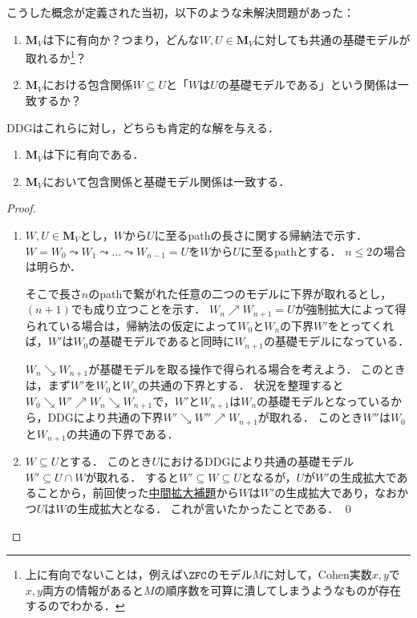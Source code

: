 \documentclass[a4j,leqno]{ltjsarticle}
\newcommand{\DDG}{\mathord{\mathrm{DDG}}}
\begin{document}
こうした概念が定義された当初，以下のような未解決問題があった：
\begin{question}
 \begin{enumerate}
  \item $\mathbf{M}_V$は下に有向か？つまり，どんな$W, U \in \mathbf{M}_V$に対しても共通の基礎モデルが取れるか\footnote{上に有向でないことは，例えば$\ZFC$のモデル$M$に対して，Cohen実数$x,y$で$x,y$両方の情報があると$M$の順序数を可算に潰してしまうようなものが存在するのでわかる．}？
  \item $\mathbf{M}_V$における包含関係$W \subseteq U$と「$W$は$U$の基礎モデルである」という関係は一致するか？
 \end{enumerate}
\end{question}

$\DDG$はこれらに対し，どちらも肯定的な解を与える．

\begin{lemma}
 \begin{enumerate}
  \item $\mathbf{M}_V$は下に有向である．
  \item $\mathbf{M}_V$において包含関係と基礎モデル関係は一致する．
 \end{enumerate}
\end{lemma}
\begin{proof}
 \begin{enumerate}
  \item $W, U \in \mathbf{M}_V$とし，$W$から$U$に至るpathの長さに関する帰納法で示す．
        $W = W_0 \leadsto W_1 \leadsto \dots \leadsto W_{n-1} = U$を$W$から$U$に至るpathとする．
        $n \leq 2$の場合は明らか．

        そこで長さ$n$のpathで繋がれた任意の二つのモデルに下界が取れるとし，$(n+1)$でも成り立つことを示す．
        $W_n \nearrow W_{n+1} = U$が強制拡大によって得られている場合は，帰納法の仮定によって$W_0$と$W_n$の下界$W'$をとってくれば，$W'$は$W_0$の基礎モデルであると同時に$W_{n+1}$の基礎モデルになっている．

        $W_n \searrow W_{n+1}$が基礎モデルを取る操作で得られる場合を考えよう．
        このときは，まず$W'$を$W_0$と$W_n$の共通の下界とする．
        状況を整理すると$W_0 \searrow W' \nearrow W_n \searrow W_{n+1}$で，$W'$と$W_{n+1}$は$W_n$の基礎モデルとなっているから，$\DDG$により共通の下界$W' \searrow W'' \nearrow W_{n+1}$が取れる．
        このとき$W''$は$W_0$と$W_{n+1}$の共通の下界である．
  \item $W \subseteq U$とする．
        このとき$U$における$\DDG$により共通の基礎モデル$W' \subseteq U \cap W$が取れる．
        すると$W' \subseteq W \subseteq U$となるが，$U$が$W'$の生成拡大であることから，前回使った\href{http://konn-san.com/math/geology-ground-definability.html\#lem:interm-ext}{中間拡大補題}から$W$は$W'$の生成拡大であり，なおかつ$U$は$W$の生成拡大となる．
        これが言いたかったことである． \qed
 \end{enumerate}
\end{proof}

\nocite{Fuchs:2014fj,Usuba:2017fp,Reitz:2007af}
\nocite{Friedman:2016lr,Hamkins:2015uq}
\printbibliography[title=参考文献]
\end{document}
